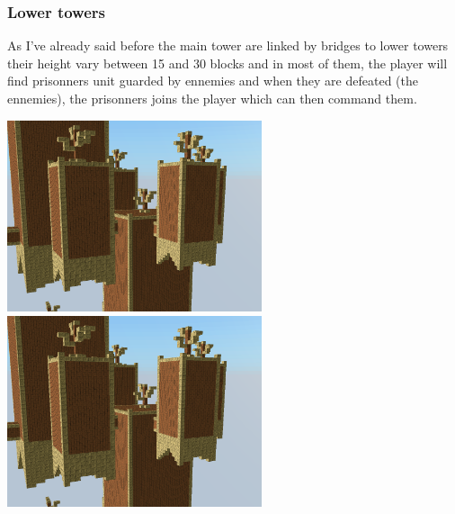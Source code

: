 \documentclass[article]{report}         %
\begin{document}
        \subsubsection{Lower towers}
          As I've already said before the main tower are linked by bridges to lower towers their height vary between 15 and 30 blocks and in most of them, the player will find prisonners unit guarded by ennemies and when they are defeated (the ennemies), the prisonners joins the player which can then command them.
          \begin{center}
            \includegraphics[width=7.5cm]{images/DT/mediumTowers.png}
            \includegraphics[width=7.5cm]{images/DT/mediumTowers.png} %
          \end{center}
\end{document}
